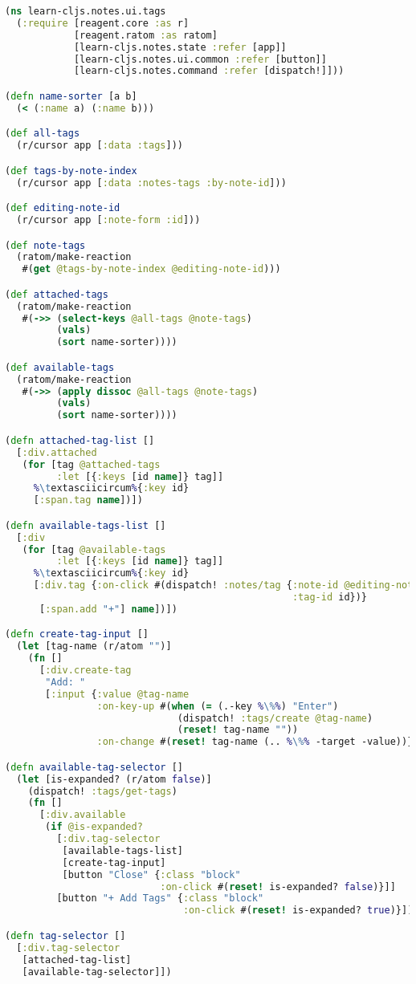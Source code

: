 \documentclass[10pt,twoside,openright]{memoir}
\begin{document}
\begin{lstlisting}[language=Clojure, caption={notes/ui/tags.cljs}]
(ns learn-cljs.notes.ui.tags
  (:require [reagent.core :as r]
            [reagent.ratom :as ratom]
            [learn-cljs.notes.state :refer [app]]
            [learn-cljs.notes.ui.common :refer [button]]
            [learn-cljs.notes.command :refer [dispatch!]]))

(defn name-sorter [a b]
  (< (:name a) (:name b)))

(def all-tags
  (r/cursor app [:data :tags]))

(def tags-by-note-index
  (r/cursor app [:data :notes-tags :by-note-id]))

(def editing-note-id
  (r/cursor app [:note-form :id]))

(def note-tags
  (ratom/make-reaction
   #(get @tags-by-note-index @editing-note-id)))

(def attached-tags
  (ratom/make-reaction
   #(->> (select-keys @all-tags @note-tags)
         (vals)
         (sort name-sorter))))

(def available-tags
  (ratom/make-reaction
   #(->> (apply dissoc @all-tags @note-tags)
         (vals)
         (sort name-sorter))))

(defn attached-tag-list []
  [:div.attached
   (for [tag @attached-tags
         :let [{:keys [id name]} tag]]
     %\textasciicircum%{:key id}
     [:span.tag name])])

(defn available-tags-list []
  [:div
   (for [tag @available-tags
         :let [{:keys [id name]} tag]]
     %\textasciicircum%{:key id}
     [:div.tag {:on-click #(dispatch! :notes/tag {:note-id @editing-note-id
                                                  :tag-id id})}
      [:span.add "+"] name])])

(defn create-tag-input []
  (let [tag-name (r/atom "")]
    (fn []
      [:div.create-tag
       "Add: "
       [:input {:value @tag-name
                :on-key-up #(when (= (.-key %\%%) "Enter")
                              (dispatch! :tags/create @tag-name)
                              (reset! tag-name ""))
                :on-change #(reset! tag-name (.. %\%% -target -value))}]])))

(defn available-tag-selector []
  (let [is-expanded? (r/atom false)]
    (dispatch! :tags/get-tags)
    (fn []
      [:div.available
       (if @is-expanded?
         [:div.tag-selector
          [available-tags-list]
          [create-tag-input]
          [button "Close" {:class "block"
                           :on-click #(reset! is-expanded? false)}]]
         [button "+ Add Tags" {:class "block"
                               :on-click #(reset! is-expanded? true)}])])))

(defn tag-selector []
  [:div.tag-selector
   [attached-tag-list]
   [available-tag-selector]])
\end{lstlisting}
\end{document}
